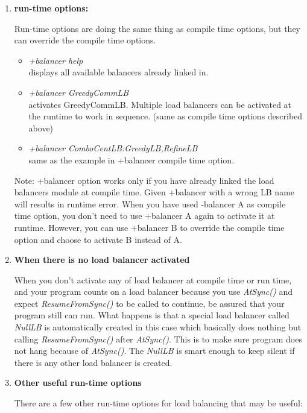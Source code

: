 \begin{enumerate}
\item {\bf run-time options:}

Run-time options are doing the same thing as compile time options, but they can override the compile time options.

\begin{itemize}
\item {\em +balancer help} \\
  displays all available balancers already linked in.
\item {\em +balancer GreedyCommLB} \\
  activates GreedyCommLB. Multiple load balancers can be activated at the runtime to work in sequence. (same as compile time options described above)
\item {\em +balancer ComboCentLB:GreedyLB,RefineLB}  \\
  same as the example in +balancer compile time option.
\end{itemize}

Note: +balancer option works only if you have already linked the load balancers module at compile time. 
Given +balancer with a wrong LB name will results in runtime error.
When you have used -balancer A as compile time option, you don't need to use 
+balancer A again to activate it at runtime. However, you can 
use +balancer B to override the compile time option and choose to
activate B instead of A.

\item {\bf When there is no load balancer activated}

When you don't activate any of load balancer at compile time or run time, 
and your program counts on a load balancer because you use {\em AtSync()}
and expect {\em ResumeFromSync()} to be called to continue,
be assured that your program still can run. 
What happens is that a special load balancer called {\em NullLB} is 
automatically created in this case which basically does nothing 
but calling {\em ResumeFromSync()} after {\em AtSync()}. 
This is to make sure program does not hang because of {\em AtSync()}.
The {\em NullLB} is smart enough to keep silent if there is any other 
load balancer is created.

\item {\bf Other useful run-time options}

There are a few other run-time options for load balancing that may be useful:


\end{enumerate}
